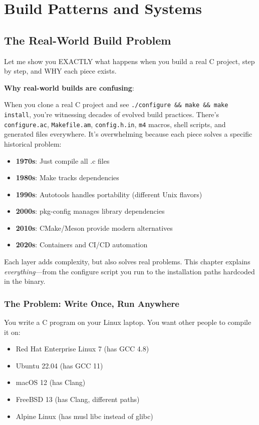 \chapter{Build Patterns and Systems}

\section{The Real-World Build Problem}

Let me show you EXACTLY what happens when you build a real C project, step by step, and WHY each piece exists.

\textbf{Why real-world builds are confusing}:

When you clone a real C project and see \texttt{./configure \&\& make \&\& make install}, you're witnessing decades of evolved build practices. There's \texttt{configure.ac}, \texttt{Makefile.am}, \texttt{config.h.in}, \texttt{m4} macros, shell scripts, and generated files everywhere. It's overwhelming because each piece solves a specific historical problem:

\begin{itemize}
    \item \textbf{1970s}: Just compile all .c files
    \item \textbf{1980s}: Make tracks dependencies
    \item \textbf{1990s}: Autotools handles portability (different Unix flavors)
    \item \textbf{2000s}: pkg-config manages library dependencies
    \item \textbf{2010s}: CMake/Meson provide modern alternatives
    \item \textbf{2020s}: Containers and CI/CD automation
\end{itemize}

Each layer adds complexity, but also solves real problems. This chapter explains \textit{everything}—from the configure script you run to the installation paths hardcoded in the binary.

\subsection{The Problem: Write Once, Run Anywhere}

You write a C program on your Linux laptop. You want other people to compile it on:
\begin{itemize}
    \item Red Hat Enterprise Linux 7 (has GCC 4.8)
    \item Ubuntu 22.04 (has GCC 11)
    \item macOS 12 (has Clang)
    \item FreeBSD 13 (has Clang, different paths)
    \item Alpine Linux (has musl libc instead of glibc)
\end{itemize}

